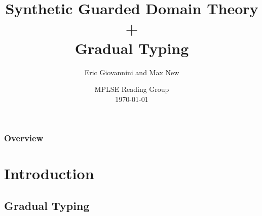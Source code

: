 \documentclass[
	11pt, %
]{beamer}
\title[SGDT + GTT]{Synthetic Guarded Domain Theory + \\ Gradual Typing} %
\author[Eric Giovannini and Max New]{Eric Giovannini and Max New} %
\institute[U-M]{University of Michigan}
\date[\today]{MPLSE Reading Group \\ \today} %
\begin{document}

\begin{frame}
	\titlepage %
\end{frame}



\begin{frame}
	\frametitle{Overview} %
	
	\tableofcontents %
\end{frame}


\section{Introduction}

\subsection{Gradual Typing}
\end{document}
